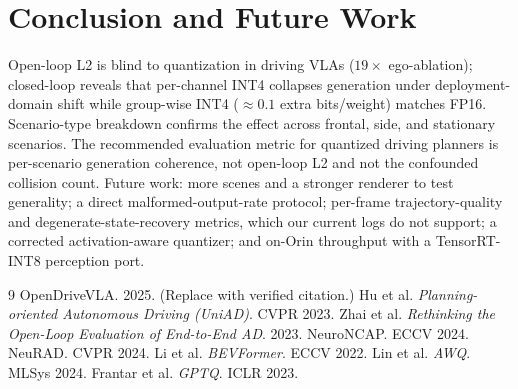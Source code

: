 \documentclass[11pt]{article}
\begin{document}
\section{Conclusion and Future Work}
Open-loop L2 is blind to quantization in driving VLAs ($19\times$ ego-ablation); closed-loop reveals
that per-channel INT4 collapses generation under deployment-domain shift while group-wise INT4
($\approx 0.1$ extra bits/weight) matches FP16. Scenario-type breakdown confirms the effect across
frontal, side, and stationary scenarios. The recommended evaluation metric for quantized driving
planners is per-scenario generation coherence, not open-loop L2 and not the confounded collision
count. Future work: more scenes and a stronger renderer to test generality; a direct
malformed-output-rate protocol; per-frame trajectory-quality and degenerate-state-recovery metrics,
which our current logs do not support; a corrected activation-aware quantizer; and on-Orin
throughput with a TensorRT-INT8 perception port.

\begin{thebibliography}{9}
 OpenDriveVLA. 2025. (Replace with verified citation.)
 Hu et al. \emph{Planning-oriented Autonomous Driving (UniAD)}. CVPR 2023.
 Zhai et al. \emph{Rethinking the Open-Loop Evaluation of End-to-End AD}. 2023.
 NeuroNCAP. ECCV 2024.
 NeuRAD. CVPR 2024.
 Li et al. \emph{BEVFormer}. ECCV 2022.
 Lin et al. \emph{AWQ}. MLSys 2024.
 Frantar et al. \emph{GPTQ}. ICLR 2023.
\end{thebibliography}
\end{document}
